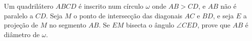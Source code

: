 Um quadrilátero $ABCD$ é inscrito num círculo $\omega$ onde $AB > CD$, e $AB$ não é paralelo a $CD$. Seja $M$ o ponto de intersecção das diagonais $AC$ e $BD$, e seja $E$ a projeção de $M$ no segmento $AB$. Se $EM$ bisecta o ângulo $\angle CED$, prove que $AB$ é diâmetro de $\omega$.
